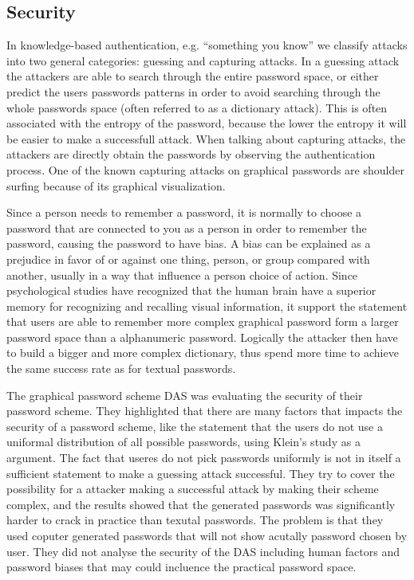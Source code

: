 
\subsection{Security}

  In knowledge-based authentication, e.g. ``something you know'' we classify attacks into two general categories: guessing and capturing attacks. In a guessing attack the attackers are able to search through the entire password space, or either predict the users passwords patterns in order to avoid searching through the whole passwords space (often referred to as a dictionary attack). This is often associated with the entropy of the password, because the lower the entropy it will be easier to make a successfull attack. When talking about capturing attacks, the attackers are directly obtain the passwords by observing the authentication process. One of the known capturing attacks on graphical passwords are shoulder surfing because of its graphical visualization.  

  Since a person needs to remember a password, it is normally to choose a password that are connected to you as a person in order to remember the password, causing the password to have bias. A bias can be explained as a prejudice in favor of or against one thing, person, or group compared with another, usually in a way that influence a person choice of action. Since psychological studies have recognized that the human brain have a superior memory for recognizing and recalling visual information, it support the statement that users are able to remember more complex graphical password form a larger password space than a alphanumeric password. Logically the attacker then have to build a bigger and more complex dictionary, thus spend more time to achieve the same success rate as for textual passwords. %

  The graphical password scheme DAS \cite{Jermyn} was evaluating the security of their password scheme. They highlighted that there are many factors that impacts the security of a password scheme, like the statement that the users do not use a uniformal distribution of all possible passwords, using Klein's study \cite{UnixPasswords} as a argument. The fact that useres do not pick passwords uniformly is not in itself a sufficient statement to make a guessing attack successful. They try to cover the possibility for a attacker making a successful attack by making their scheme complex, and the results showed that the generated passwords was significantly harder to crack in practice than texutal passwords. The problem is that they used coputer generated passwords that will not show acutally password chosen by user. They did not analyse the security of the DAS including human factors and password biases that may could incluence the practical password space. 
  

  